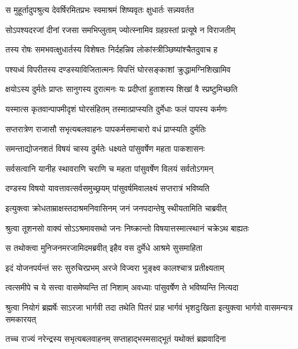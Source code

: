 
\twolineshloka
{स मुहूर्तादुपश्रुत्य देवर्षिरमितप्रभः}
{स्वमाश्रमं शिष्यवृतः क्षुधार्तः सन्न्यवर्तत} %

\twolineshloka
{सोऽपश्यदरजां दीनां रजसा समभिप्लुताम्}
{ज्योत्स्नामिव ग्रहग्रस्तां प्रत्यूषे न विराजतीम्} %

\twolineshloka
{तस्य रोषः समभवत्क्षुधार्तस्य विशेषतः}
{निर्दहन्निव लोकांस्त्रीञ्छिष्यांश्चैतदुवाच ह} %

\twolineshloka
{पश्यध्वं विपरीतस्य दण्डस्याविजितात्मनः}
{विपत्तिं घोरसङ्काशां क्रुद्धामग्निशिखामिव} %

\twolineshloka
{क्षयोऽस्य दुर्मतेः प्राप्तः सानुगस्य दुरात्मनः}
{यः प्रदीप्तां हुताशस्य शिखां वै स्प्रष्टुमिच्छति} %

\twolineshloka
{यस्मात्स कृतवान्पापमीदृशं घोरसंहितम्}
{तस्मात्प्राप्स्यति दुर्मेधाः फलं पापस्य कर्मणः} %

\twolineshloka
{सप्तरात्रेण राजासौ सभृत्यबलवाहनः}
{पापकर्मसमाचारो वधं प्राप्स्यति दुर्मतिः} %

\twolineshloka
{समन्ताद्योजनशतं विषयं चास्य दुर्मतेः}
{धक्ष्यते पांसुवर्षेण महता पाकशासनः} %

\twolineshloka
{सर्वसत्वानि यानीह स्थावराणि चराणि च}
{महता पांसुवर्षेण विलयं सर्वतोऽगमन्} %

\twolineshloka
{दण्डस्य विषयो यावत्तावत्सर्वसमुच्छ्रयम्}
{पांसुवर्षमिवालक्ष्यं सप्तरात्रं भविष्यति} %

\twolineshloka
{इत्युक्त्वा क्रोधताम्राक्षस्तदाश्रमनिवासिनम्}
{जनं जनपदान्तेषु स्थीयतामिति चाब्रवीत्} %

\twolineshloka
{श्रुत्वा तूशनसो वाक्यं सोऽऽश्रमावसथो जनः}
{निष्क्रान्तो विषयात्तस्मात्स्थानं चक्रेऽथ बाह्यतः} %

\twolineshloka
{स तथोक्त्वा मुनिजनमरजामिदमब्रवीत्}
{इहैव वस दुर्मेधे आश्रमे सुसमाहिता} %

\twolineshloka
{इदं योजनपर्यन्तं सरः सुरुचिरप्रभम्}
{अरजे विज्वरा भुङ्क्ष्व कालश्चात्र प्रतीक्ष्यताम्} %

\twolineshloka
{त्वत्समीपे च ये सत्त्वा वासमेष्यन्ति तां निशाम्}
{अवध्याः पांसुवर्षेण ते भविष्यन्ति नित्यदा} %

\threelineshloka
{श्रुत्वा नियोगं ब्रह्मर्षेः साऽरजा भार्गवी तदा}
{तथेति पितरं प्राह भार्गवं भृशदुःखिता}
{इत्युक्त्वा भार्गवो वासमन्यत्र समकारयत्} %

\twolineshloka
{तच्च राज्यं नरेन्द्रस्य सभृत्यबलवाहनम्}
{सप्ताहाद्भस्मसाद्भूतं यथोक्तं ब्रह्मवादिना} %


